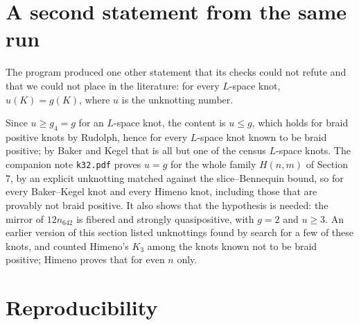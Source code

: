 \documentclass[11pt]{article}
\theoremstyle{definition}
\begin{document}
\section{A second statement from the same run}

The program produced one other statement that its checks could not refute and that we could not place in the
literature: for every $L$-space knot, $u(K) = g(K)$, where $u$ is the unknotting number.

Since $u \ge g_4 = g$ for an $L$-space knot, the content is $u \le g$, which holds for braid positive knots by Rudolph,
hence for every $L$-space knot known to be braid positive; by Baker and Kegel \cite{BK} that is all but one of the census
$L$-space knots. The companion note \texttt{k32.pdf} proves $u = g$ for the whole family $H(n,m)$ of Section 7, by an
explicit unknotting matched against the slice--Bennequin bound, so for every Baker--Kegel knot and every Himeno knot,
including those that are provably not braid positive. It also shows that the hypothesis is needed: the mirror of
$12n_{642}$ is fibered and strongly quasipositive, with $g = 2$ and $u \ge 3$. An earlier version of this section listed
unknottings found by search for a few of these knots, and counted Himeno's $K_3$ among the knots known not to be braid
positive; Himeno proves that for even $n$ only.

\section{Reproducibility}\label{sec:repro}
\end{document}
